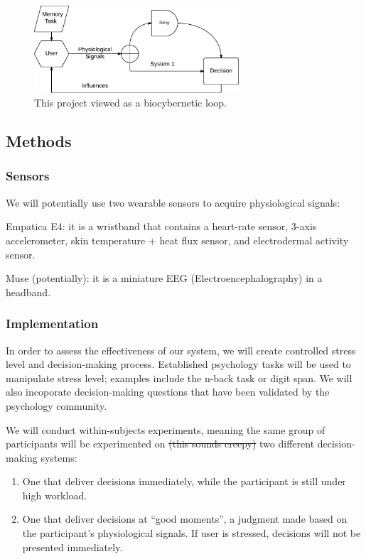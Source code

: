 \documentclass[12pt]{article}
\begin{document}
\begin{figure}[h]
\centering
\includegraphics[width=0.68\textwidth]{hci_mindmap.pdf}
\caption{This project viewed as a biocybernetic loop.}
\label{figure:mindmap}
\end{figure}




\subsection{Methods}\label{methods}

\subsubsection{Sensors}
We will potentially use two wearable sensors to acquire physiological signals:
\begin{inparaenum}[\itshape 1\upshape)]
\item {Empatica E4}: it is a wristband that contains a heart-rate sensor, 3-axis accelerometer, skin temperature + heat flux sensor, and electrodermal
activity sensor. 
\item {Muse} (potentially): it is a miniature EEG (Electroencephalography) in a headband. 
\end{inparaenum}



\subsubsection{Implementation}

In order to assess the effectiveness of our system, we will create controlled stress level and decision-making process. Established psychology tasks will be used to manipulate stress level; examples include the n-back task or digit span. We will also incoporate decision-making questions that have been validated by the psychology community. 



We will conduct within-subjects experiments, meaning the same group of participants will be experimented on \st{(this sounds creepy)} two different decision-making systems:
\begin{enumerate}
\itemsep1pt\parskip0pt
\item One that deliver decisions immediately, while the participant is still under high workload. 
\item One that deliver decisions at ``good moments'', a judgment made based on the participant's physiological signals. If user is stressed, decisions will not be presented immediately.
\end{enumerate}
\end{document}
